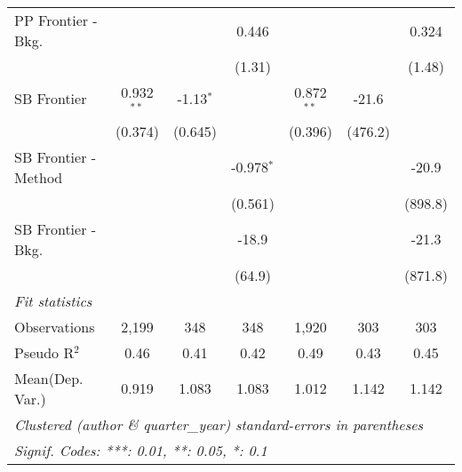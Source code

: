 \begin{tabular}{lcccccc}
   PP Frontier - Bkg.   &              &             & 0.446         &              &               & 0.324\\   
                        &              &             & (1.31)        &              &               & (1.48)\\   
   SB Frontier          & 0.932$^{**}$ & -1.13$^{*}$ &               & 0.872$^{**}$ & -21.6         &   \\   
                        & (0.374)      & (0.645)     &               & (0.396)      & (476.2)       &   \\   
   SB Frontier - Method &              &             & -0.978$^{*}$  &              &               & -20.9\\   
                        &              &             & (0.561)       &              &               & (898.8)\\   
   SB Frontier - Bkg.   &              &             & -18.9         &              &               & -21.3\\   
                        &              &             & (64.9)        &              &               & (871.8)\\   
   \midrule
   \emph{Fit statistics}\\
   Observations         & 2,199        & 348         & 348           & 1,920        & 303           & 303\\  
   Pseudo R$^2$         & 0.46         & 0.41        & 0.42          & 0.49         & 0.43          & 0.45\\  
Mean(Dep. Var.) & 0.919 & 1.083 & 1.083 & 1.012 & 1.142 & 1.142 \\
   \midrule \midrule
   \multicolumn{7}{l}{\emph{Clustered (author \& quarter\_year) standard-errors in parentheses}}\\
   \multicolumn{7}{l}{\emph{Signif. Codes: ***: 0.01, **: 0.05, *: 0.1}}\\
\end{tabular}
\par\endgroup
